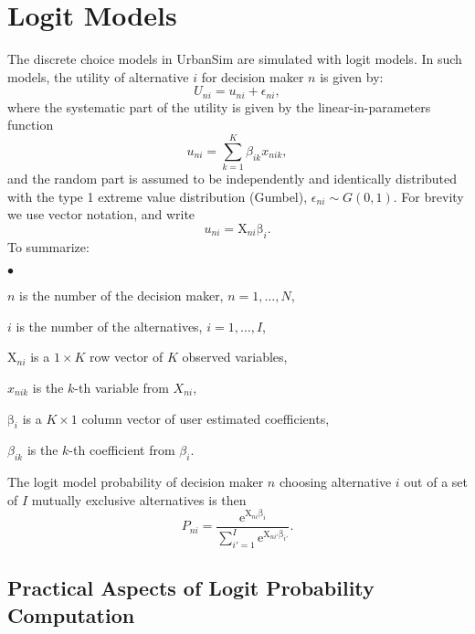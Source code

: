 \documentclass[12pt]{article}
\newenvironment{longitem}
	{\begin{list}{$\bullet$}
				{\labelwidth=2.6cm\leftmargin=2.9cm\labelsep=0.3cm
				\itemsep=0cm}}
	{\end{list}}
\newcommand{\vc}[1]{\boldsymbol{\mathrm{#1}}}
\newcommand{\e}{\mathrm{e}}
\begin{document}
%
%
%
\section*{Logit Models}

The discrete choice models in UrbanSim are simulated with logit models.
In such models, the utility of alternative $i$ for decision maker $n$ is
given by:
\begin{equation}
U_{ni} = u_{ni} + \epsilon_{ni},
\end{equation}
where the systematic part of the utility is given by the
linear-in-parameters function
\begin{equation}
u_{ni} = \sum_{k=1}^{K} \beta_{ik}x_{nik},
\end{equation}
and the random part is assumed to be independently and identically
distributed with the type 1 extreme
value distribution (Gumbel), $\epsilon_{ni}\sim G(0,1)$. For brevity we
use vector notation, and write
\begin{equation}
u_{ni} = \vc{X}_{ni}\vc{\beta}_{i}.
\end{equation}
To summarize:
\begin{longitem}
\item[$n$] is the number of the decision maker, $n=1,\ldots,N$,
\item[$i$] is the number of the alternatives, $i=1,\ldots,I$,
\item[$\vc{X}_{ni}$] is a $1\times K$ row vector of $K$ observed variables,
\item[$x_{nik}$] is the $k$-th variable from $X_{ni}$,
\item[$\vc{\beta}_{i}$] is a $K\times 1$ column vector of user estimated
coefficients,
\item[$\beta_{ik}$] is the $k$-th coefficient from $\beta_{i}$.
\end{longitem}


The logit model probability of decision maker $n$ choosing alternative $i$ out of a
set of $I$ mutually exclusive alternatives is then
\begin{equation}
P_{ni} = \frac{\e^{\vc{X}_{ni}\vc{\beta}_{i}}}
{\sum_{i'=1}^{I}\e^{\vc{X}_{ni'}\vc{\beta}_{i'}} }.
\label{eq:logitprob}
\end{equation}

\subsection*{Practical Aspects of Logit Probability Computation}
\end{document}
